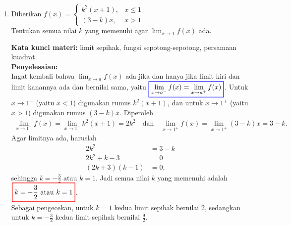 \documentclass[10pt,openany,a4paper]{article}
\theoremstyle{definition}
\theoremstyle{definition}
\theoremstyle{plain}
\newenvironment{jawab}[2][tes]{%
\par\noindent\textbf{Kata kunci materi:} #1.\\
\textbf{Penyelesaian:} #2%
}{}
\begin{document}
\begin{enumerate}
\begin{jawab}[domain fungsi, nilai mutlak, fungsi komposisi, domain fungsi komposisi]
{\begin{enumerate}
            Karena $f(x)\leq 0$, maka $f(x)\neq 2$ selalu berlaku. Selanjutnya, $f(x)=-2$ jika dan hanya jika $\sqrt{|x^2-9|}=2$, yaitu $|x^2-9|=4$, sehingga
            \begin{align*}
                x^2-9=4 \quad\vee\quad x^2-9=-4 \iff x^2=13 \quad\vee\quad x^2=5 \iff x=\pm\sqrt{13} \quad\vee\quad x=\pm\sqrt{5}.
            \end{align*}
            Didapatkan
            \begin{align*}
                \colorlet{oldcolor}{.}
        \color{red}
        \setlength{\fboxrule}{1pt} \boxed{\color{oldcolor}D(g\circ f) = \mathbb{R}\setminus\left\{-\sqrt{13},-\sqrt{5},\sqrt{5},\sqrt{13}\right\}}\color{oldcolor}.
            \end{align*}
        \end{enumerate}
    }
    \end{jawab}

    \item Diberikan $f(x)=\begin{cases}
        k^2(x+1), & x\leq 1\\
        (3-k)x, & x>1
    \end{cases}$.\\
    Tentukan semua nilai $k$ yang memenuhi agar $\displaystyle\lim_{x\to 1}f(x)$ ada.
    \begin{jawab}[limit sepihak, fungsi sepotong-sepotong, persamaan kuadrat]{~\\
        Ingat kembali bahwa $\displaystyle\lim_{x\to a}f(x)$ ada jika dan hanya jika limit kiri dan limit kanannya ada dan bernilai sama, yaitu $\colorlet{oldcolor}{.}
        \color{blue}
        \setlength{\fboxrule}{1pt} \boxed{\color{oldcolor}\lim_{x \to a^-} f(x) = \lim_{x \to a^+} f(x)}\color{oldcolor}$. Untuk $x\to 1^-$ (yaitu $x<1$) digunakan rumus $k^2(x+1)$, dan untuk $x\to 1^+$ (yaitu $x>1$) digunakan rumus $(3-k)x$. Diperoleh
        \begin{align*}
            \lim_{x\to 1^-} f(x) = \lim_{x\to 1^-} k^2(x+1) = 2k^2 \quad\text{dan}\quad \lim_{x\to 1^+} f(x) = \lim_{x\to 1^+} (3-k)x = 3-k.
        \end{align*}
        Agar limitnya ada, haruslah
        \begin{align*}
            2k^2 &= 3-k\\
            2k^2+k-3 &= 0\\
            (2k+3)(k-1) &= 0,
        \end{align*}
        sehingga $k=-\frac{3}{2}$ atau $k=1$. Jadi semua nilai $k$ yang memenuhi adalah $\colorlet{oldcolor}{.}
        \color{red}
        \setlength{\fboxrule}{1pt} \boxed{\color{oldcolor}k=-\frac{3}{2} \text{ atau } k=1}\color{oldcolor}$.\\
        Sebagai pengecekan, untuk $k=1$ kedua limit sepihak bernilai $2$, sedangkan untuk $k=-\frac{3}{2}$ kedua limit sepihak bernilai $\frac{9}{2}$.
    }
    \end{jawab}


\end{enumerate}
\end{document}
